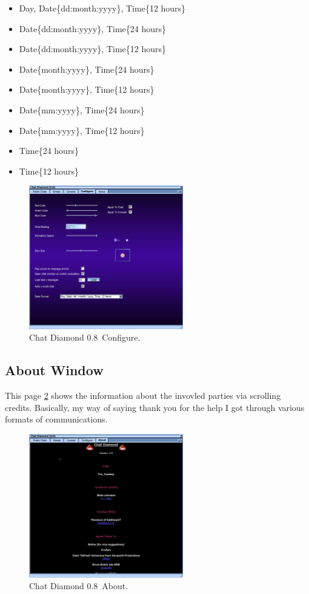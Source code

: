 \documentclass{article}
\theoremstyle{definition}
\newcommand{\ChatDiamondVersion}{0.8}
\begin{document}
\begin{itemize}
\begin{itemize}
\item Day, Date\{dd:month:yyyy\}, Time\{12 hours\}
\item Date\{dd:month:yyyy\}, Time\{24 hours\}
\item Date\{dd:month:yyyy\}, Time\{12 hours\}
\item Date\{month:yyyy\}, Time\{24 hours\}
\item Date\{month:yyyy\}, Time\{12 hours\}
\item Date\{mm:yyyy\}, Time\{24 hours\}
\item Date\{mm:yyyy\}, Time\{12 hours\}
\item Time\{24 hours\}
\item Time\{12 hours\} 
\end{itemize}
\end{itemize}

\begin{figure}
\centering
\includegraphics[width=0.6\textwidth]{img_configure}
\caption{Chat Diamond \ChatDiamondVersion~Configure.}
\label{fig:chatdiamond_configure}
\end{figure}

\subsection{About Window}

This page \ref{fig:chatdiamond_about} shows the information about the invovled parties via scrolling credits. Basically, my way of saying thank you for the help I got through various formats of communications.
\begin{figure}
\centering
\includegraphics[width=0.6\textwidth]{img_about}
\caption{Chat Diamond \ChatDiamondVersion~About.}
\label{fig:chatdiamond_about}
\end{figure}
\end{document}
